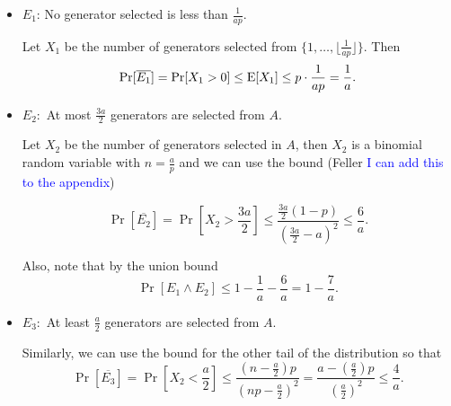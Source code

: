 \begin{itemize}
    \item $E_1$: No generator selected is less than $\frac{1}{ap}$.  \par
    Let $X_1$ be the number of generators selected from $\{1,\ldots,\lfloor\frac{1}{ap}\rfloor\}$. Then 
    \[\mathrm{Pr}[\overline{E_1}] = \mathrm{Pr}[X_1 > 0] \leq \mathrm{E}[X_1] \leq p \cdot \frac{1}{ap} = \frac{1}{a}.\]

    \item $E_2:$ At most $\frac{3a}{2}$ generators are selected from $A$.\par 
    Let $X_2$ be the number of generators selected in $A$, then $X_2$ is a binomial random variable with $n = \frac{a}{p}$ and we can use the bound (Feller \textcolor{blue}{I can add this to the appendix})

    \[\Pr[\overline{E_2}] = \Pr\left[X_2 > \frac{3a}{2}\right] \leq  \frac{\frac{3a}{2}(1 - p)}{(\frac{3a}{2} - a)^2} \leq \frac{6}{a}.\]

    Also, note that by the union bound \[\Pr[E_1\land E_2] \leq 1 - \frac{1}{a} - \frac{6}{a} = 1 - \frac{7}{a}.\]  

    \item $E_3:$ At least $\frac{a}{2}$ generators are selected from $A$. \par 
    Similarly, we can use the bound for the other tail of the distribution so that 
    \[\Pr[ \overline{E_3}] = \Pr\left[X_2 < \frac{a}{2}\right] \leq  \frac{(n - \frac{a}{2})p}{(np - \frac{a}{2})^2} = \frac{a - (\frac{a}{2})p}{(\frac{a}{2})^2} \leq \frac{4}{a}.\]
    

\end{itemize}
